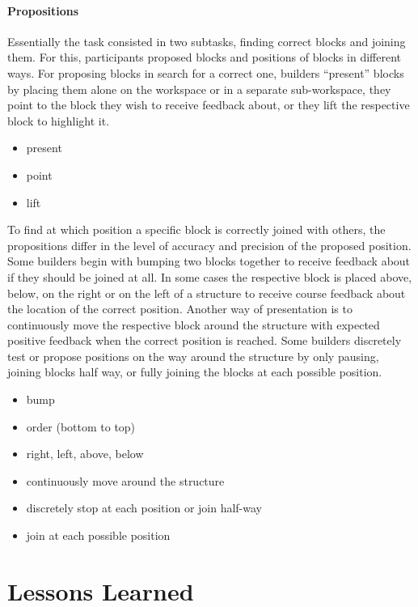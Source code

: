 \paragraph{Propositions} Essentially the task consisted in two subtasks, finding correct blocks and joining them. For this, participants proposed blocks and positions of blocks in different ways. For proposing blocks in search for a correct one, builders ``present'' blocks by placing them alone on the workspace or in a separate sub-workspace, they point to the block they wish to receive feedback about, or they lift the respective block to highlight it.
\begin{itemize}
\item present
\item point
\item lift
\end{itemize}
To find at which position a specific block is correctly joined with others, the propositions differ in the level of accuracy and precision of the proposed position. Some builders begin with bumping two blocks together to receive feedback about if they should be joined at all. In some cases the respective block is placed above, below, on the right or on the left of a structure to receive course feedback about the location of the correct position. Another way of presentation is to continuously move the respective block around the structure with expected positive feedback when the correct position is reached. Some builders discretely test or propose positions on the way around the structure by only pausing, joining blocks half way, or fully joining the blocks at each possible position.
\begin{itemize}
\item bump
\item order (bottom to top)
\item right, left, above, below
\item continuously move around the structure
\item discretely stop at each position or join half-way
\item join at each possible position
\end{itemize}

\section{Lessons Learned}



